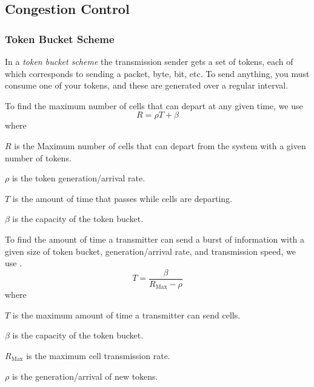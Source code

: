 \subsection{Congestion Control}\label{subsec:Congestion_Control}

\subsubsection{Token Bucket Scheme}\label{subsubsec:Token_Bucket_Scheme}
\begin{definition}\label{def:Token_Bucket_Scheme}
  In a \emph{token bucket scheme} the transmission sender gets a set of tokens, each of which corresponds to sending a packet, byte, bit, etc.
  To send anything, you must consume one of your tokens, and these are generated over a regular interval.
\end{definition}

To find the maximum number of cells that can depart at any given time, we use 
\begin{equation}\label{eq:Token_Bucket_Max_Cells}
  R = \rho T + \beta
\end{equation}
where
\begin{description}[noitemsep]
\item $R$ is the Maximum number of cells that can depart from the system with a given number of tokens.
\item $\rho$ is the token generation/arrival rate.
\item $T$ is the amount of time that passes while cells are departing.
\item $\beta$ is the capacity of the token bucket.
\end{description}

To find the amount of time a transmitter can send a burst of information with a given size of token bucket, generation/arrival rate, and transmission speed, we use .
\begin{equation}\label{eq:Token_Bucket_Max_Burst_Time}
  T = \frac{\beta}{R_{\mathrm{Max}}-\rho}
\end{equation}
where
\begin{description}[noitemsep]
\item $T$ is the maximum amount of time a transmitter can send cells.
\item $\beta$ is the capacity of the token bucket.
\item $R_{\mathrm{Max}}$ is the maximum cell transmission rate.
\item $\rho$ is the generation/arrival of new tokens.
\end{description}


